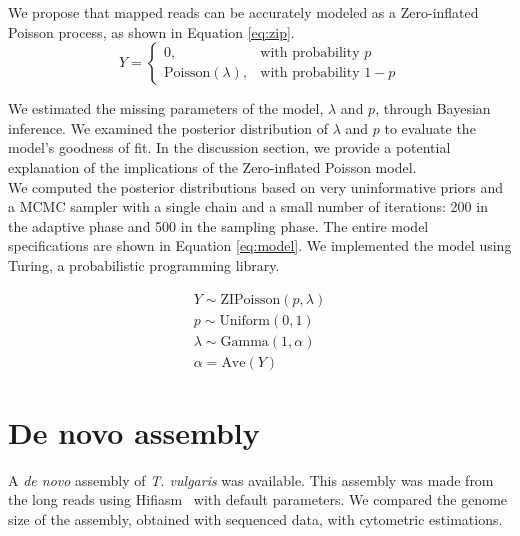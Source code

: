 We propose that mapped reads can be accurately modeled as a Zero-inflated Poisson process, as shown in Equation \eqref{eq:zip}. \\

\begin{equation}
\label{eq:zip}
Y = \begin{cases} 0, & \textrm{with probability } p \\ \textrm{Poisson}(\lambda), & \textrm{with probability } 1-p \end{cases}
\end{equation}

We estimated the missing parameters of the model, $\lambda$ and $p$, through Bayesian inference. We examined the posterior distribution of $\lambda$ and $p$ to evaluate the model's goodness of fit. In the discussion section, we provide a potential explanation of the implications of the Zero-inflated Poisson model.\\

We computed the posterior distributions based on very uninformative priors and a \ac{MCMC} sampler with a single chain and a small number of iterations: 200 in the adaptive phase and 500 in the sampling phase. The entire model specifications are shown in Equation \eqref{eq:model}. We implemented the model using Turing, a probabilistic programming library.~\cite{DBLP:conf/aistats/GeXG18}

\begin{subequations}
\label{eq:model}
\begin{align}
Y \sim \textrm{ZIPoisson}(p, \lambda) \label{eq:model1}\\
p \sim \textrm{Uniform}(0, 1) \label{eq:model2}\\
\lambda \sim \textrm{Gamma}(1, \alpha)  \label{eq:model3}\\
\alpha = \textrm{Ave}(Y) \label{eq:model4}
\end{align}   
\end{subequations}

\section*{De novo assembly}\label{sec:denovo}

A \textit{de novo} assembly of \textit{T. vulgaris} was available. This assembly was made from the long reads using Hifiasm~\cite{chengHaplotyperesolvedNovoAssembly2021} with default parameters. We compared the genome size of the assembly, obtained with sequenced data,  with cytometric estimations.~\cite{PlantDNACvalues}

